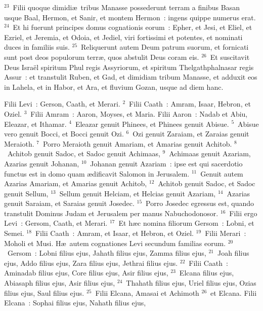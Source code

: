 ${}^{23}$~Filii quoque dimidi\ae\ tribus Manasse possederunt terram a finibus Basan usque Baal, Hermon, et Sanir, et montem Hermon~: ingens quippe numerus erat.
${}^{24}$~Et hi fuerunt principes domus cognationis eorum~: Epher, et Jesi, et Eliel, et Ezriel, et Jeremia, et Odoia, et Jediel, viri fortissimi et potentes, et nominati duces in familiis suis.
${}^{25}$~Reliquerunt autem Deum patrum suorum, et fornicati sunt post deos populorum terr\ae , quos abstulit Deus coram eis.
${}^{26}$~Et suscitavit Deus Isra\"el spiritum Phul regis Assyriorum, et spiritum Thelgathphalnasar regis Assur~: et transtulit Ruben, et Gad, et dimidiam tribum Manasse, et adduxit eos in Lahela, et in Habor, et Ara, et fluvium Gozan, usque ad diem hanc.

\bchapter
\lettrine[lines=3,image=true,loversize=0.05,lraise=-0.03]{F}{}ilii Levi~: Gerson, Caath, et Merari.
${}^{2}$~Filii Caath~: Amram, Isaar, Hebron, et Oziel.
${}^{3}$~Filii Amram~: Aaron, Moyses, et Maria. Filii Aaron~: Nadab et Abiu, Eleazar, et Ithamar.
${}^{4}$~Eleazar genuit Phinees, et Phinees genuit Abisue.
${}^{5}$~Abisue vero genuit Bocci, et Bocci genuit Ozi.
${}^{6}$~Ozi genuit Zaraiam, et Zaraias genuit Meraioth.
${}^{7}$~Porro Meraioth genuit Amariam, et Amarias genuit Achitob.
${}^{8}$~Achitob genuit Sadoc, et Sadoc genuit Achimaas,
${}^{9}$~Achimaas genuit Azariam, Azarias genuit Johanan,
${}^{10}$~Johanan genuit Azariam~: ipse est qui sacerdotio functus est in domo quam \ae dificavit Salomon in Jerusalem.
${}^{11}$~Genuit autem Azarias Amariam, et Amarias genuit Achitob,
${}^{12}$~Achitob genuit Sadoc, et Sadoc genuit Sellum,
${}^{13}$~Sellum genuit Helciam, et Helcias genuit Azariam,
${}^{14}$~Azarias genuit Saraiam, et Saraias genuit Josedec.
${}^{15}$~Porro Josedec egressus est, quando transtulit Dominus Judam et Jerusalem per manus Nabuchodonosor.
${}^{16}$~Filii ergo Levi~: Gersom, Caath, et Merari.
${}^{17}$~Et h\ae c nomina filiorum Gersom~: Lobni, et Semei.
${}^{18}$~Filii Caath~: Amram, et Isaar, et Hebron, et Oziel.
${}^{19}$~Filii Merari~: Moholi et Musi. H\ae\ autem cognationes Levi secundum familias eorum.
${}^{20}$~Gersom~: Lobni filius ejus, Jahath filius ejus, Zamma filius ejus,
${}^{21}$~Joah filius ejus, Addo filius ejus, Zara filius ejus, Jethrai filius ejus.
${}^{22}$~Filii Caath~: Aminadab filius ejus, Core filius ejus, Asir filius ejus,
${}^{23}$~Elcana filius ejus, Abiasaph filius ejus, Asir filius ejus,
${}^{24}$~Thahath filius ejus, Uriel filius ejus, Ozias filius ejus, Saul filius ejus.
${}^{25}$~Filii Elcana, Amasai et Achimoth
${}^{26}$~et Elcana. Filii Elcana~: Sophai filius ejus, Nahath filius ejus,
